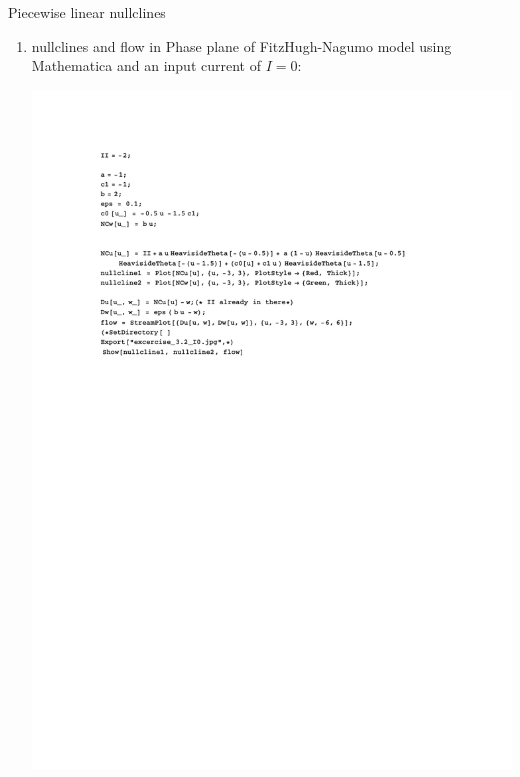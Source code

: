 \documentclass[12pt]{article}
\newenvironment{exercise}[2][Exercise]{\begin{trivlist}
\item[\hskip \labelsep {\bfseries #1}\hskip \labelsep {\bfseries #2.}]}{\end{trivlist}}
\begin{document}
\begin{exercise}{3.2}
Piecewise linear nullclines \\
\renewcommand{\labelenumi}{\alph{enumi})}
\begin{enumerate}
\item nullclines and flow in Phase plane of FitzHugh-Nagumo model using Mathematica and an input current of $I=0$:

	\includegraphics[width=5.6in]{code_32}


\end{enumerate}
\end{exercise}
\end{document}
